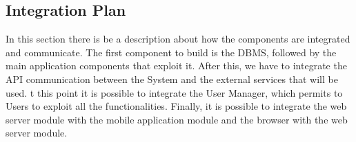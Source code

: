 \subsection{Integration Plan}
In this section there is be a description about how the components are integrated and communicate.
The first component to build is the DBMS, followed by the main application components that exploit it.
After this, we have to integrate the API communication between the System and the external services that will be used.
t this point it is possible to integrate the User Manager, which permits to Users to exploit all the functionalities.
Finally, it is possible to integrate the web server module with the mobile application module and the browser with the web server module.
